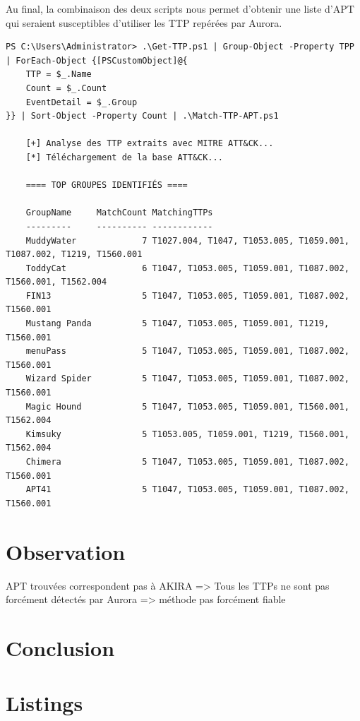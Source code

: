 \documentclass[12pt,letterpaper]{article}
\begin{document}
Au final, la combinaison des deux scripts nous permet d'obtenir une liste d'APT qui seraient susceptibles d'utiliser les TTP repérées par Aurora.
\begin{lstlisting}[caption={Identification des APTs}, label={lst:apt_logs}]
PS C:\Users\Administrator> .\Get-TTP.ps1 | Group-Object -Property TPP | ForEach-Object {[PSCustomObject]@{
    TTP = $_.Name
    Count = $_.Count
    EventDetail = $_.Group
}} | Sort-Object -Property Count | .\Match-TTP-APT.ps1

    [+] Analyse des TTP extraits avec MITRE ATT&CK...
    [*] Téléchargement de la base ATT&CK...

    ==== TOP GROUPES IDENTIFIÉS ====

    GroupName     MatchCount MatchingTTPs
    ---------     ---------- ------------
    MuddyWater             7 T1027.004, T1047, T1053.005, T1059.001, T1087.002, T1219, T1560.001
    ToddyCat               6 T1047, T1053.005, T1059.001, T1087.002, T1560.001, T1562.004
    FIN13                  5 T1047, T1053.005, T1059.001, T1087.002, T1560.001
    Mustang Panda          5 T1047, T1053.005, T1059.001, T1219, T1560.001
    menuPass               5 T1047, T1053.005, T1059.001, T1087.002, T1560.001
    Wizard Spider          5 T1047, T1053.005, T1059.001, T1087.002, T1560.001
    Magic Hound            5 T1047, T1053.005, T1059.001, T1560.001, T1562.004
    Kimsuky                5 T1053.005, T1059.001, T1219, T1560.001, T1562.004
    Chimera                5 T1047, T1053.005, T1059.001, T1087.002, T1560.001
    APT41                  5 T1047, T1053.005, T1059.001, T1087.002, T1560.001
\end{lstlisting}



\section{Observation}

APT trouvées correspondent pas à AKIRA
=> Tous les TTPs ne sont pas forcément détectés par Aurora
=> méthode pas forcément fiable

\section{Conclusion}



\newpage
\section{Listings}




\newpage
\end{document}

